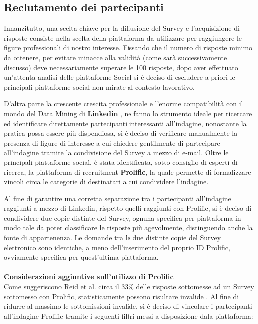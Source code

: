     \subsection{Reclutamento dei partecipanti}
    
    Innanzitutto, una scelta chiave per la diffusione del Survey e l'acquisizione di risposte consiste nella scelta della piattaforma da utilizzare per raggiungere le figure professionali di nostro interesse. Fissando che il numero di risposte minimo da ottenere, per evitare minacce alla validità (come sarà successivamente discusso) deve necessariamente superare le 100 risposte, dopo aver effettuato un'attenta analisi delle piattaforme Social si è deciso di escludere a priori le principali piattaforme social non mirate al contesto lavorativo. 
    
    D'altra parte la crescente crescita professionale e l'enorme compatibilità con il mondo del Data Mining di \textbf{Linkedin} \cite{sumbaly2013big}, ne fanno lo strumento ideale per ricercare ed identificare direttamente partecipanti interessanti all'indagine, nonostante la pratica possa essere più dispendiosa, si è deciso di verificare manualmente la presenza di figure di interesse a cui chiedere gentilmente di partecipare all'indagine tramite la condivisione del Survey a mezzo di e-mail.  Oltre le principali piattaforme social, è stata identificata, sotto consiglio di esperti di ricerca, la piattaforma di recruitment \textbf{Prolific}, la quale permette di formalizzare vincoli circa le categorie di destinatari a cui condividere l'indagine. 
    
    Al fine di garantire una corretta separazione tra i partecipanti all'indagine raggiunti a mezzo di Linkedin, rispetto quelli raggiunti con Prolific, si è deciso di condividere due copie distinte del Survey, ognuna specifica per piattaforma in modo tale da poter classificare le risposte più agevolmente, distinguendo anche la fonte di appartenenza. Le domande tra le due distinte copie del Survey elettronico sono identiche, a meno dell'inserimento del proprio ID Prolific, ovviamente specifica per quest'ultima piattaforma.\\\\
    
    \textbf{Considerazioni aggiuntive sull'utilizzo di Prolific}\\
    Come suggeriscono Reid et al. circa il 33\% delle risposte sottomesse ad un Survey sottomesso con Prolific, statisticamente possono risultare invalide \cite{reid2022software}. Al fine di ridurre al massimo le sottomissioni invalide, si è deciso di vincolare i partecipanti all'indagine Prolific tramite i seguenti filtri messi a disposizione dala piattaforma:
    
